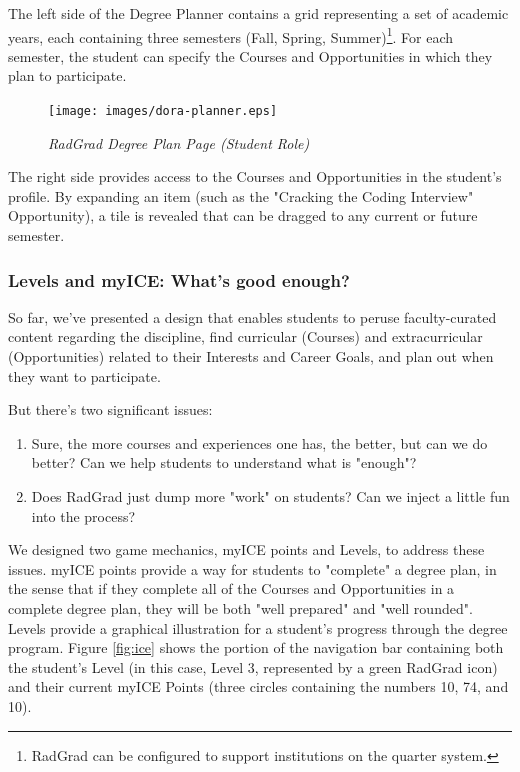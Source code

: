 \documentclass[acmsmall]{acmart}
\begin{document}
The left side of the Degree Planner contains a grid representing a set of academic years, each containing three semesters (Fall, Spring, Summer)\footnote{RadGrad can be configured to support institutions on the quarter system.}.  For each semester, the student can specify the Courses and Opportunities in which they plan to participate.

\begin{figure}[ht]
\centering
\texttt{[image: images/dora-planner.eps]}
\caption{\em RadGrad Degree Plan Page (Student Role)}
\label{fig:radgrad-student-degree-plan}
\end{figure}

The right side provides access to the Courses and Opportunities in the student's profile. By expanding an item (such as the "Cracking the Coding Interview" Opportunity), a tile is revealed that can be dragged to any current or future semester.

\subsubsection{Levels and myICE: What's good enough?}

So far, we've presented a design that enables students to peruse faculty-curated content regarding the discipline, find curricular (Courses) and extracurricular (Opportunities) related to their Interests and Career Goals, and plan out when they want to participate.

But there's two significant issues:
\begin{enumerate}
\item Sure, the more courses and experiences one has, the better, but can we do better? Can we help students to understand what is "enough"?
\item Does RadGrad just dump more "work" on students? Can we inject a little fun into the process?
\end{enumerate}

We designed two game mechanics, myICE points and Levels, to address these issues.  myICE points provide a way for students to "complete" a degree plan, in the sense that if they complete all of the Courses and Opportunities in a complete degree plan, they will be both "well prepared" and "well rounded".  Levels provide a graphical illustration for a student's progress through the degree program. Figure \ref{fig:ice} shows the portion of the navigation bar containing both the student's Level (in this case, Level 3, represented by a green RadGrad icon) and their current myICE Points (three circles containing the numbers 10, 74, and 10).
\end{document}
